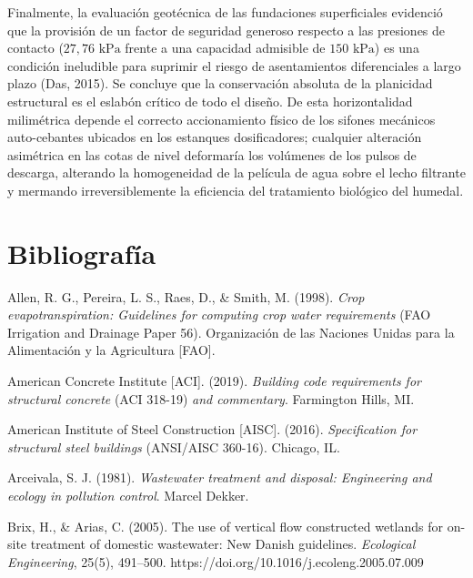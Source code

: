\documentclass[12pt, letterpaper]{report}
\begin{document}
Finalmente, la evaluación geotécnica de las fundaciones superficiales evidenció que la provisión de un factor de seguridad generoso respecto a las presiones de contacto ($27,76\text{ kPa}$ frente a una capacidad admisible de $150\text{ kPa}$) es una condición ineludible para suprimir el riesgo de asentamientos diferenciales a largo plazo (Das, 2015). Se concluye que la conservación absoluta de la planicidad estructural es el eslabón crítico de todo el diseño. De esta horizontalidad milimétrica depende el correcto accionamiento físico de los sifones mecánicos auto-cebantes ubicados en los estanques dosificadores; cualquier alteración asimétrica en las cotas de nivel deformaría los volúmenes de los pulsos de descarga, alterando la homogeneidad de la película de agua sobre el lecho filtrante y mermando irreversiblemente la eficiencia del tratamiento biológico del humedal.

\newpage

\chapter*{Bibliografía}

\begingroup
\setlength{\parindent}{0pt}
\setlength{\hangindent}{1.27cm}
\setlength{\parskip}{0.8em}

Allen, R. G., Pereira, L. S., Raes, D., \& Smith, M. (1998). \textit{Crop evapotranspiration: Guidelines for computing crop water requirements} (FAO Irrigation and Drainage Paper 56). Organización de las Naciones Unidas para la Alimentación y la Agricultura [FAO].

American Concrete Institute [ACI]. (2019). \textit{Building code requirements for structural concrete} (ACI 318-19) \textit{and commentary}. Farmington Hills, MI.

American Institute of Steel Construction [AISC]. (2016). \textit{Specification for structural steel buildings} (ANSI/AISC 360-16). Chicago, IL.

Arceivala, S. J. (1981). \textit{Wastewater treatment and disposal: Engineering and ecology in pollution control}. Marcel Dekker.

Brix, H., \& Arias, C. (2005). The use of vertical flow constructed wetlands for on-site treatment of domestic wastewater: New Danish guidelines. \textit{Ecological Engineering}, 25(5), 491--500. https://doi.org/10.1016/j.ecoleng.2005.07.009
\end{document}
